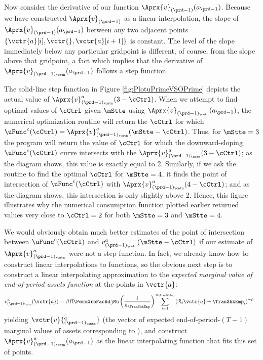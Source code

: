 \documentclass[titlepage, headings=optiontotocandhead]{Resources/texmf-local/tex/latex/econtex}
\begin{document}
 Now consider the derivative of our function
$\Aprx{v}_{({\prd-1})}(a_{\prd-1})$.  Because we have constructed
$\Aprx{v}_{({\prd-1})}$ as a linear interpolation, the slope of
$\Aprx{v}_{({\prd-1})}(a_{\prd-1})$ between any two adjacent
points $\{\vctr{a}[i],\vctr{},\vctr{a}[{i+1}]\}$ is constant.  The
level of the slope immediately below any particular gridpoint is
different, of course, from the slope above that gridpoint, a fact
which implies that the derivative of
$\Aprx{v}_{({\prd-1})_\cntn}(a_{\prd-1})$ follows a step function.

The solid-line step function in Figure \ref{fig:PlotuPrimeVSOPrime}
depicts the actual value of
$\Aprx{v}_{({\prd-1})_\cntn}^{a}(3-\cCtrl)$.  When we attempt to find
optimal values of $\cCtrl$ given $\mStte$ using
$\Aprx{v}_{({\prd-1})_\cntn}(a_{\prd-1})$, the numerical optimization
routine will return the $\cCtrl$ for which $\uFunc^{c}(\cCtrl) =
\Aprx{v}^{a}_{({\prd-1})_\cntn}(\mStte-\cCtrl)$.  Thus, for
$\mStte=3$ the program will return the value of $\cCtrl$ for
which the downward-sloping $\uFunc^{c}(\cCtrl)$ curve intersects with the
$\Aprx{v}_{({\prd-1})_\cntn}^{a}(3-\cCtrl)$; as the diagram shows,
this value is exactly equal to 2.  Similarly, if we ask the routine
to find the optimal $\cCtrl$ for $\mStte=4$, it finds the point
of intersection of $\uFunc^{c}(\cCtrl)$ with
$\Aprx{v}_{({\prd-1})_\cntn}^{a}(4-\cCtrl)$; and as the diagram shows,
this intersection is only slightly above 2.  Hence, this figure
illustrates why the numerical consumption function plotted earlier
returned values very close to $\cCtrl=2$ for both $\mStte=3$ and
$\mStte=4$.

We would obviously obtain much better estimates of the point of intersection between $\uFunc^{c}(\cCtrl)$ and $v_{({\prd-1})_\cntn}^{a}(\mStte-\cCtrl)$ if our estimate of $\Aprx{v}^{a}_{({\prd-1})_\cntn}$ were not a step function.  In fact, we already know how to construct linear interpolations to functions, so the obvious next step is to construct a linear interpolating approximation to the \textit{expected marginal value of end-of-period assets function} at the points in $\vctr{a}$:
\begin{equation}\begin{gathered}\begin{aligned}
      v_{({\prd-1})_\cntn}^{a}(\vctr{a})  & =  \beta R \PermGroFacAdjMu \left(\frac{1}{n_{\TranShkEmp}}\right) \sum_{i=1}^{n_{\TranShkEmp}} \left(\mathcal{R}_{t} \vctr{a} + \TranShkEmp_{i}\right)^{-\rho} \label{eq:vEndPrimeTm1}
    \end{aligned}\end{gathered}\end{equation}
yielding $\vctr{v}{^{a}_{({\prd-1})_\cntn}}$ (the vector of expected end-of-period-$(T-1)$ marginal values of assets corresponding to ),  %
and construct
$\Aprx{v}_{({\prd-1})_\cntn}^{a}(a_{\prd-1})$ as the linear
interpolating function that fits this set of points.
\end{document}
